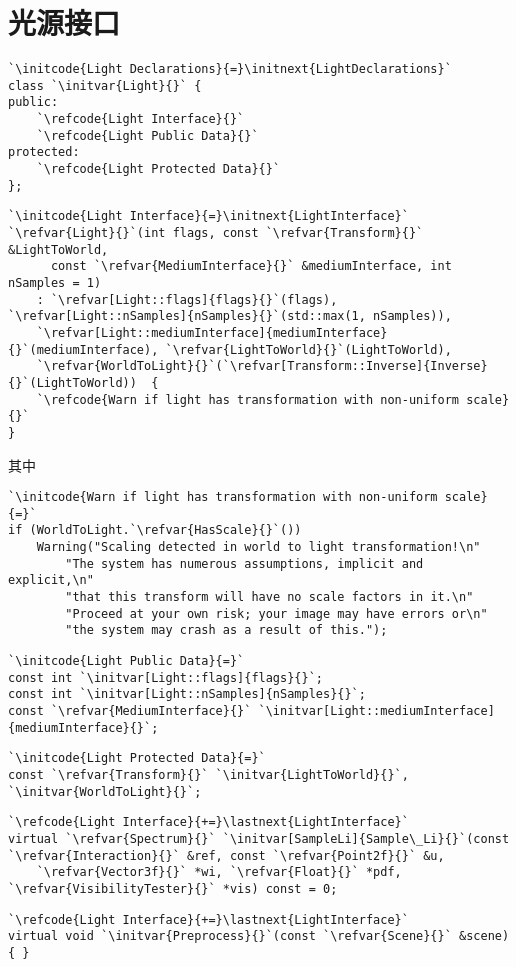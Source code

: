 \section{光源接口}\label{sec:光源接口}

\begin{lstlisting}
`\initcode{Light Declarations}{=}\initnext{LightDeclarations}`
class `\initvar{Light}{}` {
public:
    `\refcode{Light Interface}{}`
    `\refcode{Light Public Data}{}`
protected:
    `\refcode{Light Protected Data}{}`
};
\end{lstlisting}

\begin{lstlisting}
`\initcode{Light Interface}{=}\initnext{LightInterface}`
`\refvar{Light}{}`(int flags, const `\refvar{Transform}{}` &LightToWorld,
      const `\refvar{MediumInterface}{}` &mediumInterface, int nSamples = 1)
    : `\refvar[Light::flags]{flags}{}`(flags), `\refvar[Light::nSamples]{nSamples}{}`(std::max(1, nSamples)),
    `\refvar[Light::mediumInterface]{mediumInterface}{}`(mediumInterface), `\refvar{LightToWorld}{}`(LightToWorld),
    `\refvar{WorldToLight}{}`(`\refvar[Transform::Inverse]{Inverse}{}`(LightToWorld))  { 
    `\refcode{Warn if light has transformation with non-uniform scale}{}`
}
\end{lstlisting}
其中
\begin{lstlisting}
`\initcode{Warn if light has transformation with non-uniform scale}{=}`
if (WorldToLight.`\refvar{HasScale}{}`())
    Warning("Scaling detected in world to light transformation!\n"
        "The system has numerous assumptions, implicit and explicit,\n"
        "that this transform will have no scale factors in it.\n"
        "Proceed at your own risk; your image may have errors or\n"
        "the system may crash as a result of this.");
\end{lstlisting}
\begin{lstlisting}
`\initcode{Light Public Data}{=}`
const int `\initvar[Light::flags]{flags}{}`;
const int `\initvar[Light::nSamples]{nSamples}{}`;
const `\refvar{MediumInterface}{}` `\initvar[Light::mediumInterface]{mediumInterface}{}`;
\end{lstlisting}

\begin{lstlisting}
`\initcode{Light Protected Data}{=}`
const `\refvar{Transform}{}` `\initvar{LightToWorld}{}`, `\initvar{WorldToLight}{}`;
\end{lstlisting}
\begin{lstlisting}
`\refcode{Light Interface}{+=}\lastnext{LightInterface}`
virtual `\refvar{Spectrum}{}` `\initvar[SampleLi]{Sample\_Li}{}`(const `\refvar{Interaction}{}` &ref, const `\refvar{Point2f}{}` &u,
    `\refvar{Vector3f}{}` *wi, `\refvar{Float}{}` *pdf, `\refvar{VisibilityTester}{}` *vis) const = 0;
\end{lstlisting}
\begin{lstlisting}
`\refcode{Light Interface}{+=}\lastnext{LightInterface}`
virtual void `\initvar{Preprocess}{}`(const `\refvar{Scene}{}` &scene) { }
\end{lstlisting}

